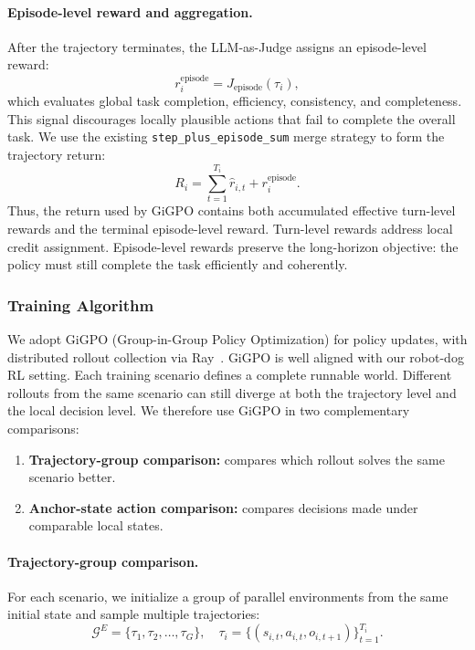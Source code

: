 \paragraph{Episode-level reward and aggregation.}
After the trajectory terminates, the LLM-as-Judge assigns an episode-level reward:
\begin{equation}
r_i^{\mathrm{episode}}
=
J_{\mathrm{episode}}(\tau_i),
\end{equation}
which evaluates global task completion, efficiency, consistency, and completeness. This signal discourages locally plausible actions that fail to complete the overall task. We use the existing \texttt{step\_plus\_episode\_sum} merge strategy to form the trajectory return:
\begin{equation}
R_i
=
\sum_{t=1}^{T_i}\hat r_{i,t}
+
r_i^{\mathrm{episode}}.
\end{equation}
Thus, the return used by GiGPO contains both accumulated effective turn-level rewards and the terminal episode-level reward. Turn-level rewards address local credit assignment. Episode-level rewards preserve the long-horizon objective: the policy must still complete the task efficiently and coherently.

\subsubsection{Training Algorithm}

We adopt GiGPO (Group-in-Group Policy Optimization) for policy updates, with distributed rollout collection via Ray~\citep{feng2025gigpo}. GiGPO is well aligned with our robot-dog RL setting. Each training scenario defines a complete runnable world. Different rollouts from the same scenario can still diverge at both the trajectory level and the local decision level. We therefore use GiGPO in two complementary comparisons:
\begin{enumerate}
    \item \textbf{Trajectory-group comparison:} compares which rollout solves the same scenario better.
    \item \textbf{Anchor-state action comparison:} compares decisions made under comparable local states.
\end{enumerate}

\paragraph{Trajectory-group comparison.}
For each scenario, we initialize a group of parallel environments from the same initial state and sample multiple trajectories:
\begin{equation}
\mathcal{G}^{E}
=
\{\tau_1,\tau_2,\ldots,\tau_G\},
\quad
\tau_i
=
\{(s_{i,t},a_{i,t},o_{i,t+1})\}_{t=1}^{T_i}.
\end{equation}


